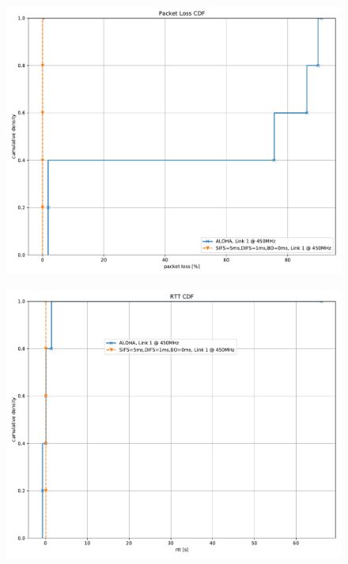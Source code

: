 \documentclass{article}
\begin{document}
\begin{figure}
	\includegraphics[width=\textwidth]{aloha_no_bo/cdf/packet_loss_cdf}
\end{figure}

\begin{figure}
	\includegraphics[width=\textwidth]{aloha_no_bo/cdf/rtt_cdf}
\end{figure}
\end{document}
